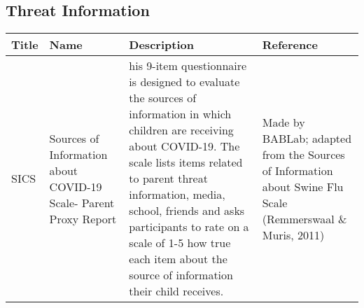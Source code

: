 \documentclass[]{book}
\begin{document}
\hypertarget{threat-information}{%
\subsection{Threat Information}\label{threat-information}}

\begin{longtable}[]{@{}llll@{}}
\toprule
\begin{minipage}[b]{0.22\columnwidth}\raggedright
Title\strut
\end{minipage} & \begin{minipage}[b]{0.27\columnwidth}\raggedright
Name\strut
\end{minipage} & \begin{minipage}[b]{0.22\columnwidth}\raggedright
Description\strut
\end{minipage} & \begin{minipage}[b]{0.18\columnwidth}\raggedright
Reference\strut
\end{minipage}\tabularnewline
\midrule
\endhead
\begin{minipage}[t]{0.22\columnwidth}\raggedright
SICS\strut
\end{minipage} & \begin{minipage}[t]{0.27\columnwidth}\raggedright
Sources of Information about COVID-19 Scale- Parent Proxy Report\strut
\end{minipage} & \begin{minipage}[t]{0.22\columnwidth}\raggedright
his 9-item questionnaire is designed to evaluate the sources of information in which children are receiving about COVID-19. The scale lists items related to parent threat information, media, school, friends and asks participants to rate on a scale of 1-5 how true each item about the source of information their child receives.\strut
\end{minipage} & \begin{minipage}[t]{0.18\columnwidth}\raggedright
Made by BABLab; adapted from the Sources of Information about Swine Flu Scale (Remmerswaal \& Muris, 2011)\strut
\end{minipage}\tabularnewline
\bottomrule
\end{longtable}


\end{document}
